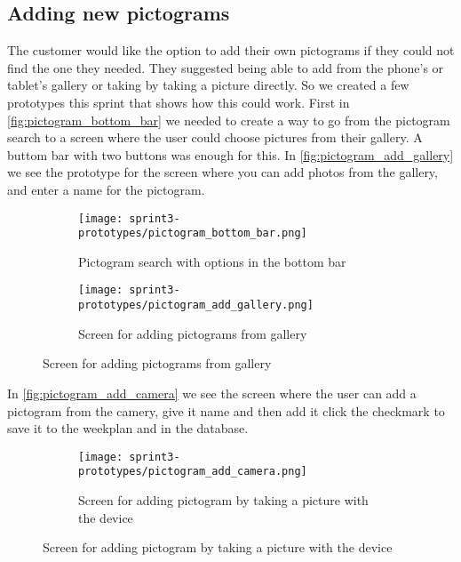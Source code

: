 \subsection{Adding new pictograms}
The customer would like the option to add their own pictograms if they could not find the one they needed. They suggested being able to add from the phone's or tablet's gallery or taking by taking a picture directly. So we created a few prototypes this sprint that shows how this could work. First in \autoref{fig:pictogram_bottom_bar} we needed to create a way to go from the pictogram search to a screen where the user could choose pictures from their gallery. A buttom bar with two buttons was enough for this. In \autoref{fig:pictogram_add_gallery} we see the prototype for the screen where you can add photos from the gallery, and enter a name for the pictogram.

\begin{figure}[H]
    \begin{subfigure}{0.5\textwidth}
    \texttt{[image: sprint3-prototypes/pictogram\_bottom\_bar.png]} 
    \caption{Pictogram search with options in the bottom bar}
    \label{fig:pictogram_bottom_bar}
    \end{subfigure}
    \begin{subfigure}{0.5\textwidth}
        \texttt{[image: sprint3-prototypes/pictogram\_add\_gallery.png]}
    \caption{Screen for adding pictograms from gallery}
    \label{fig:pictogram_add_gallery}
    \end{subfigure} 
\end{figure}

In \autoref{fig:pictogram_add_camera} we see the screen where the user can add a pictogram from the camery, give it name and then add it click the checkmark to save it to the weekplan and in the database.

\begin{figure}[H]
    \begin{subfigure}{0.5\textwidth}
    \texttt{[image: sprint3-prototypes/pictogram\_add\_camera.png]} 
    \caption{Screen for adding pictogram by taking a picture with the device}
    \label{fig:pictogram_add_camera}
    \end{subfigure}
\end{figure}